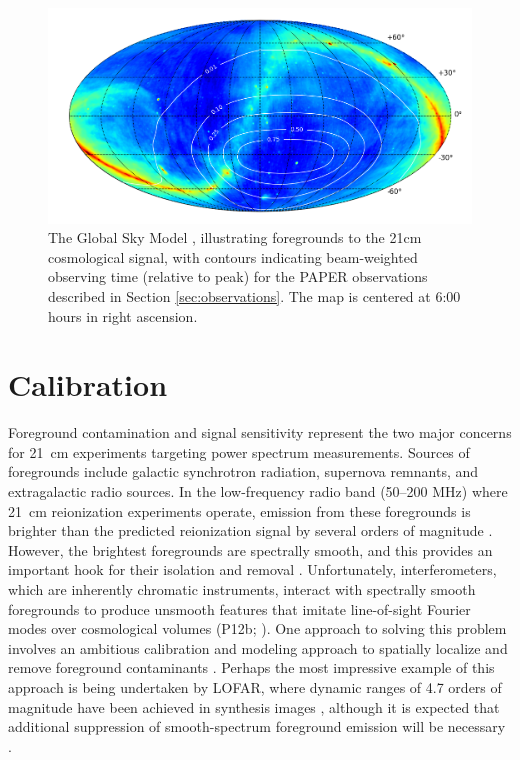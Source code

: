 \documentclass[twocolumn,numberedappendix]{emulateapj} \shorttitle{PSA64}
\begin{document}
\begin{figure}\centering
\includegraphics[width=2\columnwidth]{plots/coverage.png}
\caption{The Global Sky Model \citep{deoliveira2008}, illustrating foregrounds to the 21cm
cosmological signal, with 
contours indicating beam-weighted observing time (relative to peak) for the PAPER observations
described in Section \ref{sec:observations}.  The map is centered at 6:00 hours in right ascension.
}\label{fig:coverage}
\end{figure}


\section{Calibration}\label{sec:calib}

Foreground contamination and signal sensitivity represent the two major concerns for 21~cm
experiments targeting power spectrum measurements. Sources of foregrounds include
galactic synchrotron radiation, supernova remnants, and extragalactic radio sources.
In the low-frequency radio band (50--200 MHz) where 21~cm reionization
experiments operate, emission from these foregrounds is brighter than the
predicted reionization signal by several orders of magnitude
\citep{ghosh_et_al2011,bernardi_et_al2010,bernardi_et_al2009,ali_et_al2008,deoliveira2008,jelic_et_al2008,santos_et_al2005}.
However, the brightest foregrounds are spectrally smooth, and this provides an
important hook for their isolation and removal
\citep{liu_tegmark2012,petrovic_oh2011,liu_et_al2009}.  Unfortunately,
interferometers, which are inherently chromatic
instruments, interact with spectrally smooth foregrounds to produce unsmooth features that
imitate line-of-sight Fourier modes over cosmological volumes (P12b; \citealt{bowman_et_al2009,morales_et_al2006a}).
One approach to solving this problem involves an ambitious calibration and modeling approach to spatially localize and
remove foreground contaminants \citep{chapman_et_al2013,sullivan_et_al2012,harker_et_al2009,liu_et_al2008,bowman_et_al2008}.
Perhaps the most impressive example of this approach is being undertaken by LOFAR, where dynamic ranges of 4.7 
orders of magnitude have
been achieved in synthesis images \citep{yatawatta_et_al2013}, although it is expected that additional
suppression of smooth-spectrum foreground emission will be necessary \citep{chapman_et_al2013}.
\end{document}
